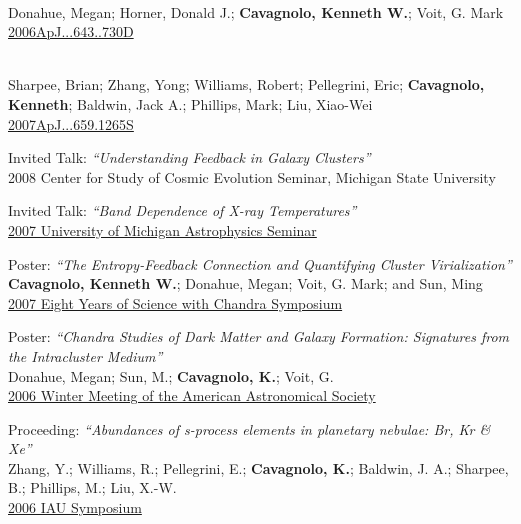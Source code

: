 \documentclass[11pt]{cv}
\begin{document}
\begin{llist}
{}\\
Donahue, Megan; Horner, Donald J.; {\bf Cavagnolo, Kenneth W.}; Voit, G. Mark\\
\href{http://adsabs.harvard.edu/abs/2006ApJ...643..730D}{2006ApJ...643..730D}

{}\\
Sharpee, Brian; Zhang, Yong; Williams, Robert; Pellegrini, Eric; {\bf Cavagnolo, Kenneth}; Baldwin, Jack A.; Phillips, Mark; Liu, Xiao-Wei\\
\href{http://adsabs.harvard.edu/abs/2007ApJ...659.1265S}{2007ApJ...659.1265S}



{\sc Invited Talk: {\textit{``Understanding Feedback in Galaxy Clusters''}}}\\
2008 Center for Study of Cosmic Evolution Seminar, Michigan State University

{\sc Invited Talk: {\textit{``Band Dependence of X-ray Temperatures''}}}\\
\href{http://www.pa.msu.edu/people/cavagnolo/annarbor_07.pdf}{2007
University of Michigan Astrophysics Seminar}

{\sc Poster: {\textit{``The Entropy-Feedback Connection and Quantifying Cluster Virialization''}}}\\
{\bf Cavagnolo, Kenneth W.}; Donahue, Megan; Voit, G. Mark; and Sun, Ming\\
\href{http://cxc.harvard.edu/symposium_2007/proceedings/posters//074_Cavagnolo.pdf}{2007
Eight Years of Science with Chandra Symposium}

{\sc Poster: {\textit{``Chandra Studies of Dark Matter and Galaxy Formation:
Signatures from the Intracluster Medium''}}}\\
Donahue, Megan; Sun, M.; {\bf Cavagnolo, K.}; Voit, G.\\
\href{http://adsabs.harvard.edu/abs/2006AAS...209.7711D}{2006 Winter
Meeting of the American Astronomical Society}

{\sc Proceeding: {\textit{``Abundances of s-process elements in planetary nebulae: Br, Kr \& Xe''}}}\\
Zhang, Y.; Williams, R.; Pellegrini, E.; {\bf Cavagnolo, K.}; Baldwin,
J. A.; Sharpee, B.; Phillips, M.; Liu, X.-W.\\
\href{http://adsabs.harvard.edu/abs/2006IAUS..234..549Z}{2006 IAU
Symposium}


\end{llist}
\end{document}
